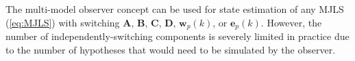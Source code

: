 %

The multi-model observer concept can be used for state estimation of any MJLS (\ref{eq:MJLS}) with switching $\mathbf{A}$, $\mathbf{B}$, $\mathbf{C}$, $\mathbf{D}$, $\mathbf{w}_p(k)$, or $\mathbf{e}_p(k)$. However, the number of independently-switching components is severely limited in practice due to the number of hypotheses that would need to be simulated by the observer.

